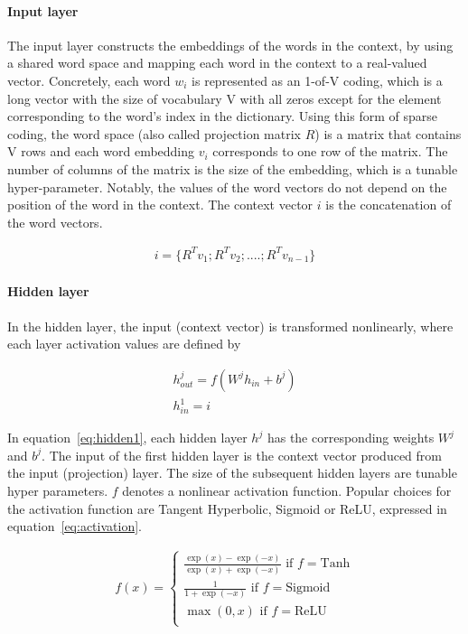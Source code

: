 \paragraph{Input layer}
The input layer constructs the embeddings of the words in the context, by using a shared word space and mapping each word in the context to a real-valued vector. Concretely, each word $w_i$ is represented as an 1-of-V coding, which is a long vector with the size of vocabulary V with all zeros except for the element corresponding to the word's index in the dictionary. Using this form of sparse coding, the word space (also called projection matrix $R$) is a matrix that contains V rows and each word embedding $v_i$ corresponds to one row of the matrix. The number of columns of the matrix is the size of the embedding, which is a tunable hyper-parameter. Notably, the values of the word vectors do not depend on the position of the word in the context. The context vector $i$ is the concatenation of the word vectors.

\begin{equation}
\begin{aligned}
i = \{R^T v_1; R^T v_2; .... ; R^T v_{n-1} \}
\end{aligned}  
\end{equation}


\paragraph{Hidden layer}
In the hidden layer, the input (context vector) is transformed nonlinearly, where each layer activation values are defined by

\begin{equation}
\begin{aligned}
h^j_{out} = f(W^j h_{in} + b^j) \\
h^1_{in} = i
\label{eq:hidden1}
\end{aligned}  
\end{equation}

In equation~\ref{eq:hidden1}, each hidden layer $h^j$ has the corresponding weights $W^j$ and $b^j$. The input of the first hidden layer is the context vector produced from the input (projection) layer. The size of the subsequent hidden layers are tunable hyper parameters. $f$ denotes a nonlinear activation function. Popular choices for the activation function are Tangent Hyperbolic, Sigmoid or ReLU, expressed in equation~\ref{eq:activation}. 


\begin{equation}
\begin{aligned}
 f(x) = 
	\begin{cases}
	\frac{\exp (x) - \exp (-x)}{\exp (x) + \exp (-x)}    \text{    if } f = \text{Tanh} \\
	\frac{1}{1 + \exp(-x)}                \text{     if } f = \text{Sigmoid} \\
	\max(0, x) \text{     if } f = \text{ReLU} \\
	\end{cases}
\label{eq:activation}
\end{aligned}
\end{equation}

